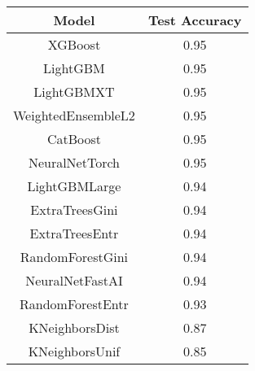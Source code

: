 \small
\begin{tabular}{cc}
\toprule
Model & Test Accuracy \\
\midrule
XGBoost & 0.95 \\
LightGBM & 0.95 \\
LightGBMXT & 0.95 \\
WeightedEnsembleL2 & 0.95 \\
CatBoost & 0.95 \\
NeuralNetTorch & 0.95 \\
LightGBMLarge & 0.94 \\
ExtraTreesGini & 0.94 \\
ExtraTreesEntr & 0.94 \\
RandomForestGini & 0.94 \\
NeuralNetFastAI & 0.94 \\
RandomForestEntr & 0.93 \\
KNeighborsDist & 0.87 \\
KNeighborsUnif & 0.85 \\
\bottomrule
\end{tabular}

\normalsize